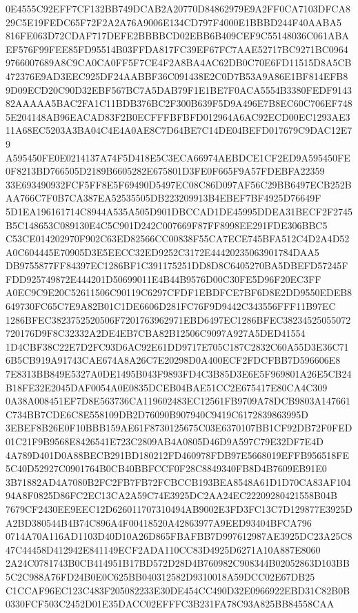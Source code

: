 \documentclass[UTF8,fontset=fandol,zihao=-4,a4paper]{ctexart}
\begin{document}
{{0E4555C92EFF7CF132BB749DCAB2A20770D84862979E9A2FF0CA7103DFCA829C5E19FEDC65F72F2A2A76A9006E134CD797F4000E1BBBD244F40AABA5
816FE063D72CDAF717DEFE2BBBBCD02EBB6B409CEF9C55148036C061ABAEF576F99FEE85FD95514B03FFDA817FC39EF67FC7AAE52717BC9271BC0964
9766007689A8C9CA0CA0FF5F7CE4F2A8BA4AC62DB0C70E6FD11515D8A5CB472376E9AD3EEC925DF24AABBF36C091438E2C0D7B53A9A86E1BF814EFB8
9D09ECD20C90D32EBF567BC7A5DAB79F1E1BE7F0ACA5554B3380FEDF914382AAAAA5BAC2FA1C11BDB376BC2F300B639F5D9A496E7B8EC60C706EF748
5E204148AB96EACAD83F2B0ECFFFBFBFD012964A6AC92ECD00EC1293AE311A68EC5203A3BA04C4E4A0AE8C7D64BE7C14DE04BEFD017679C9DAC12E79
A595450FE0E0214137A74F5D418E5C3ECA66974AEBDCE1CF2ED9A595450FE0F8213BD766505D2189B6605282E675801D3FE0F665F9A57FDEBFA22359
33E693490932FCF5FF8E5F69490D5497EC08C86D097AF56C29BB6497ECB252BAA766C7F0B7CA387EA52535505DB223209913B4EBEF7BF4925D76649F
5D1EA196161714C8944A535A505D901DBCCAD1DE45995DDEA31BECF2F2745B5C148653C089130E4C5C901D242C007669F87FF8998EE291FDE306BBC5
C53CE014202970F902C63ED82566CC00838F55CA7ECE745BFA512C4D2A4D52A0C604445E70905D3E5EECC32ED9252C3172E44420235063901784DAA5
DB9755877FF84397EC1286BF1C391175251DD8D8C6405270BA5DBEFD57245FFDD925749872E444201D50699011E4B44B9576D00C30FE5D96F20EC3FF
A0EC9C9E20C52611506C90119C6297CFDF1EBDFCE7BF6D8E2DD9550EDEB8649730FC65C7E9A82B01C1DE6606D281FC76F9D9442C343556FFF11B97EC
1286BFEC3823752520506F7201763962971EBD6497EC1286BFEC38234525055072720176D9F8C32332A2DE4EB7CBA82B12506C9097A927A5DED41554
1D4CBF38C22E7D2FC93D6AC92E61DD9717E705C187C2832C60A55D3E36C716B5CB919A91743CAE674A8A26C7E20298D0A400ECF2FDCFBB7D596606E8
7E8313BB849E5327A0DE1495B043F9893FD4C3B85D3E6E5F969801A26E5CB24B18FE32E2045DAF0054A0E0835DCEB04BAE51CC2E675417E80CA4C309
0A38A008451EF7D8E563736CA119602483EC12561FB9709A78DCB9803A147661C734BB7CDE6C8E558109DB2D76090B907940C9419C6172839863995D
3EBEF8B26E0F10BBB159AE61F8730125675C03E6370107BB1CF92DB72F0FED01C21F9B9568E8426541E723C2809AB4A0805D46D9A597C79E32DF7E4D
4A789D401D0A88BECB291BD180212FD460978FDB97E5668019EFFB956518FE5C40D52927C0901764B0CB40BBFCCF0F28C8849340FB8D4B7609EB91E0
3B71882AD4A7080B2FC2FB7FB72FCBCCB193BEA8548A61D1D70CA83AF10494A8F0825D86FC2EC13CA2A59C74E3925DC2AA24EC22209280421558B04B
7679CF2430EE9EEC12D626011707310494AB9002E3FD3FC13C7D129877E3925DA2BD380544B4B74C896A4F00418520A42863977A9EED93404BFCA796
0714A70A116AD1103D40D10A26D865FBAFBB7D997612987AE3925DC23A25C847C44458D412942E841149ECF2ADA110CC83D4925D6271A10A887E8060
2A24C0781743B0CB414951B17BD572D28D4B760982C908344B02052863D103BB5C2C988A76FD24B0E0C625BB040312582D9310018A59DCC02E67DB25
C1CCAF96EC123C483F205082233E30DE454CC490D32E0966922EBD31C82B0B0330FCF503C2452D01E35DACC02EFFFC3B231FA78C93A825BB84558CAA
}}
\end{document}

